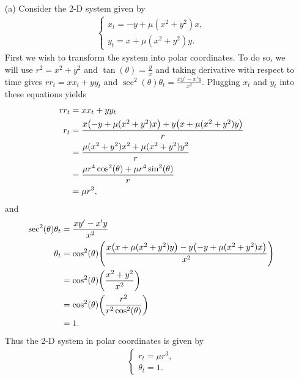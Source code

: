 \documentclass[12pt]{report}
\begin{document}
\begin{solution}

    \noindent
    \begin{enumerate}
        \item [(a)]
        Consider the 2-D system given by
        \begin{align*}
            \begin{cases}
                x_t = - y + \mu (x^2 + y^2)x,\\
                y_t = x + \mu (x^2 + y^2)y.
            \end{cases}
        \end{align*}
        First we wish to transform the system into polar coordinates. To do so, we will use $r^2 = x^2 + y^2$ and $\tan(\theta) = \frac{y}{x}$ and taking derivative with respect to time gives $rr_t = xx_t + yy_t$ and $\sec^2(\theta)\theta_t = \frac{xy' - x'y}{x^2}.$ Plugging $x_t$ and $y_t$ into these equations yields
        \begin{align*}
            rr_t &= xx_t + yy_t\\
            r_t &= \frac{x{\left(- y + \mu (x^2 + y^2)x\right)} + y{\left(x + \mu (x^2 + y^2)y\right)}}{r}\\
            &= \frac{\mu (x^2 + y^2)x^2 + \mu (x^2 + y^2)y^2}{r}\\
            &= \frac{\mu r^4 \cos^2(\theta) + \mu r^4 \sin^2(\theta)}{r}\\
            &= \mu r^3,
        \end{align*}
        and
        \begin{align*}
            \sec^2(\theta)\theta_t &= \frac{xy' - x'y}{x^2}\\
            \theta_t &= \cos^2(\theta) {\left(\frac{x{\left(x + \mu (x^2 + y^2)y\right)} - y{\left(- y + \mu (x^2 + y^2)x\right)}}{x^2}\right)}\\
            &= \cos^2(\theta){\left(\frac{x^2 + y^2}{x^2}\right)}\\
            &= \cos^2(\theta){\left(\frac{r^2}{r^2\cos^2(\theta)}\right)}\\
            &= 1.
        \end{align*}
        Thus the 2-D system in polar coordinates is given by
        \begin{align*}
            \begin{cases}
                r_t = \mu r^3,\\
                \theta_t = 1.
            \end{cases}
        \end{align*}

\end{enumerate}
\end{solution}
\end{document}
